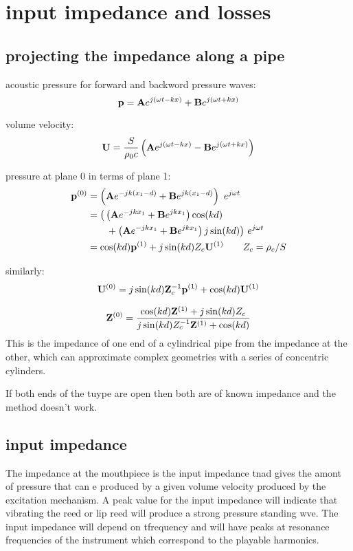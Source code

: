\documentclass[10pt, a4paper, twocolumn]{article}
\begin{document}
\section{input impedance and losses}

\subsection{projecting the impedance along a pipe}

acoustic pressure for forward and backword pressure waves:
\[\vb p = \vb A e^{j(\omega t-kx)}
+ \vb B e^{j(\omega t+kx)} \]

volume velocity:
\[ \vb U= \frac{S}{\rho _0c}\left(
\vb A e^{j(\omega t-kx)}
- \vb B e^{j(\omega t+kx)} \right)\]

pressure at plane 0 in terms of plane 1:
\begin{equation*}
\begin{aligned}
\vb p^{(0)}&= \left( \vb A e^{-jk(x_1-d)}
+ \vb B e^{jk(x_1-d)} \right)\ e^{j\omega t}
\\&=\big(
\left( \vb Ae^{-jkx_1}+\vb Be^{jkx_1}\right) \cos (kd)
\\&\qquad + \left( \vb Ae^{-jkx_1}+\vb Be^{jkx_1}\right)
j\sin (kd)\big)\ e^{j\omega t}
\\&=\cos (kd)\vb p^{(1)}+j\sin (kd)Z_c\vb U^{(1)}
\qquad Z_c=\rho _c/S
\end{aligned}
\end{equation*}

similarly:
\[\vb U^{(0)}=j\sin (kd) \vb Z_c^{-1}\vb p^{(1)}
+\cos(kd)\vb U^{(1)}\]

\[\vb Z^{(0)} =
\frac{\cos (kd)\vb Z^{(1)}+j\sin (kd)Z_c}
{j\sin(kd)Z_c^{-1}\vb Z^{(1)}+\cos(kd)} \]
This is the impedance of one end of a cylindrical pipe from the impedance at the other, which can approximate complex geometries with a series of concentric cylinders.

If both ends of the tuype are open then both are of known impedance and the method doesn't work.

\subsection{input impedance}

The impedance at the mouthpiece is the input impedance tnad gives the amont of pressure that can e produced by a given volume velocity produced by the excitation mechanism.
A peak value for the input impedance will indicate that vibrating the reed or lip reed will produce a strong pressure standing wve. The input impedance will depend on tfrequency and will have peaks at resonance frequencies of the instrument which correspond to the playable harmonics.
\end{document}
